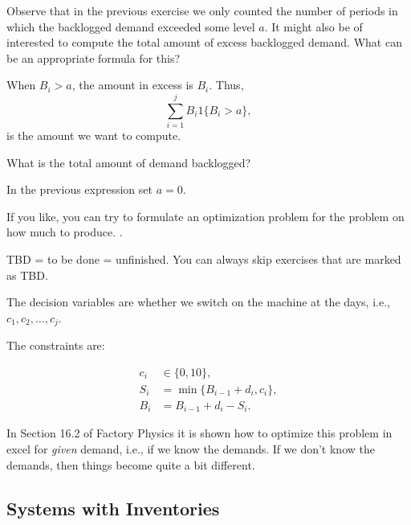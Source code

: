 \begin{question}
  Observe that in the previous exercise we only counted the number of
  periods in which the backlogged demand exceeded some level $a$. It
  might also be of interested to compute the total amount of
excess  backlogged demand. What can be an appropriate formula for this? 
\begin{solution}
    When $B_i>a$, the amount in excess is $B_i$. Thus, 
    \begin{equation*}
      \sum_{i=1}^j B_i 1 \{B_i > a\},
    \end{equation*}
  is the amount we want to compute. 
\end{solution}
\end{question}

\begin{question}
  What is the total amount of demand backlogged? 
  \begin{solution}
    In the previous expression set $a=0$. 
  \end{solution}
\end{question}

\begin{question}
  If you like, you can try to formulate an optimization problem for
  the problem on how much to produce. .
  \begin{solution}

    TBD = to be done = unfinished. You can always skip exercises that
    are marked as TBD.

The decision variables are whether we switch on the machine at the days, i.e., $c_1, c_2, \ldots, c_j$. 

The constraints are:

\begin{align*}
c_i &\in \{0, 10\}, \\
      S_i &= \min\{B_{i-1}+d_i, c_i\}, \\
  B_i &= B_{i-1}+d_i - S_i.
\end{align*}

In Section 16.2 of Factory Physics it is shown how to optimize this
problem in excel for \emph{given} demand, i.e., if we know the
demands.  If we don't know the demands, then things become quite a bit
different.

  \end{solution}
\end{question}



\subsection{Systems with Inventories}
\label{sec:inventories}

